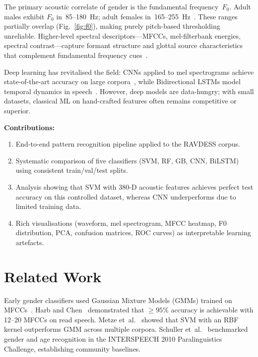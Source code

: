 \documentclass[conference]{IEEEtran}
\begin{document}
The primary acoustic correlate of gender is the fundamental
frequency~$F_0$. Adult males exhibit $F_0$ in~85--180~Hz; adult females
in~165--255~Hz~\cite{titze1994principles}.
These ranges partially overlap (Fig.~\ref{fig:f0}), making purely
pitch-based thresholding unreliable.
Higher-level spectral descriptors---MFCCs, mel-filterbank energies,
spectral contrast---capture formant structure and glottal source
characteristics that complement fundamental frequency cues~\cite{davis1980comparison}.

Deep learning has revitalised the field: CNNs applied to mel spectrograms
achieve state-of-the-art accuracy on large corpora~\cite{zhao2018sound},
while Bidirectional LSTMs model temporal dynamics in
speech~\cite{graves2013speech}.
However, deep models are data-hungry; with small datasets, classical ML
on hand-crafted features often remains competitive or superior.

\textbf{Contributions:}
\begin{enumerate}
  \item End-to-end pattern recognition pipeline applied to the RAVDESS corpus.
  \item Systematic comparison of five classifiers (SVM, RF, GB, CNN, BiLSTM)
        using consistent train/val/test splits.
  \item Analysis showing that SVM with 380-D acoustic features achieves
        perfect test accuracy on this controlled dataset, whereas CNN
        underperforms due to limited training data.
  \item Rich visualisations (waveform, mel spectrogram, MFCC heatmap,
        F0 distribution, PCA, confusion matrices, ROC curves) as
        interpretable learning artefacts.
\end{enumerate}

\section{Related Work}

Early gender classifiers used Gaussian Mixture Models (GMMs) trained on
MFCCs~\cite{reynolds1995speaker}. Harb and
Chen~\cite{harb2005gender} demonstrated that $\geq\!95\%$ accuracy is
achievable with 12--20 MFCCs on read speech.
Metze et~al.~\cite{metze2007comparison} showed that SVM with an RBF kernel
outperforms GMM across multiple corpora.
Schuller et~al.~\cite{schuller2010interspeech} benchmarked gender and age
recognition in the INTERSPEECH 2010 Paralinguistics Challenge,
establishing community baselines.
\end{document}

